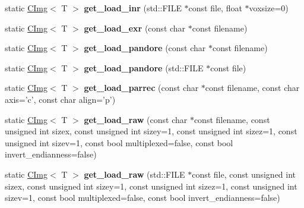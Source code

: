 \begin{DoxyCompactItemize}
\item 
\hypertarget{structcimg__library_1_1CImg_a46ec0553367b8a86808cab7ca80a4d17}{
static \hyperlink{structcimg__library_1_1CImg}{CImg}$<$ T $>$ {\bfseries get\_\-load\_\-inr} (std::FILE $\ast$const file, float $\ast$voxsize=0)}
\label{structcimg__library_1_1CImg_a46ec0553367b8a86808cab7ca80a4d17}

\item 
\hypertarget{structcimg__library_1_1CImg_a2fcc56406715b63dce2a8a1b77e17ce4}{
static \hyperlink{structcimg__library_1_1CImg}{CImg}$<$ T $>$ {\bfseries get\_\-load\_\-exr} (const char $\ast$const filename)}
\label{structcimg__library_1_1CImg_a2fcc56406715b63dce2a8a1b77e17ce4}

\item 
\hypertarget{structcimg__library_1_1CImg_a142e63e1c36c29a05205030511a6aad6}{
static \hyperlink{structcimg__library_1_1CImg}{CImg}$<$ T $>$ {\bfseries get\_\-load\_\-pandore} (const char $\ast$const filename)}
\label{structcimg__library_1_1CImg_a142e63e1c36c29a05205030511a6aad6}

\item 
\hypertarget{structcimg__library_1_1CImg_ae5624cbb87158820addf58b5fae9abba}{
static \hyperlink{structcimg__library_1_1CImg}{CImg}$<$ T $>$ {\bfseries get\_\-load\_\-pandore} (std::FILE $\ast$const file)}
\label{structcimg__library_1_1CImg_ae5624cbb87158820addf58b5fae9abba}

\item 
\hypertarget{structcimg__library_1_1CImg_a950e29d88cfc3c84cf6ca80cfd39cc40}{
static \hyperlink{structcimg__library_1_1CImg}{CImg}$<$ T $>$ {\bfseries get\_\-load\_\-parrec} (const char $\ast$const filename, const char axis='c', const char align='p')}
\label{structcimg__library_1_1CImg_a950e29d88cfc3c84cf6ca80cfd39cc40}

\item 
\hypertarget{structcimg__library_1_1CImg_a16ba67618d068b7e334d9899dbbe178b}{
static \hyperlink{structcimg__library_1_1CImg}{CImg}$<$ T $>$ {\bfseries get\_\-load\_\-raw} (const char $\ast$const filename, const unsigned int sizex, const unsigned int sizey=1, const unsigned int sizez=1, const unsigned int sizev=1, const bool multiplexed=false, const bool invert\_\-endianness=false)}
\label{structcimg__library_1_1CImg_a16ba67618d068b7e334d9899dbbe178b}

\item 
\hypertarget{structcimg__library_1_1CImg_a5c2d4f122c4a58f4b7a4b6f1310dac81}{
static \hyperlink{structcimg__library_1_1CImg}{CImg}$<$ T $>$ {\bfseries get\_\-load\_\-raw} (std::FILE $\ast$const file, const unsigned int sizex, const unsigned int sizey=1, const unsigned int sizez=1, const unsigned int sizev=1, const bool multiplexed=false, const bool invert\_\-endianness=false)}
\label{structcimg__library_1_1CImg_a5c2d4f122c4a58f4b7a4b6f1310dac81}


\end{DoxyCompactItemize}
